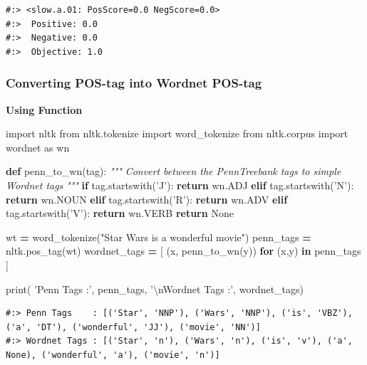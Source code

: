 \documentclass[
]{book}
\newenvironment{Shaded}{\begin{snugshade}}{\end{snugshade}}
\newcommand{\BuiltInTok}[1]{#1}
\newcommand{\CharTok}[1]{\textcolor[rgb]{0.5,0.5,0.5}{#1}}
\newcommand{\CommentTok}[1]{\textcolor[rgb]{0.37,0.37,0.37}{\textit{#1}}}
\newcommand{\ControlFlowTok}[1]{\textcolor[rgb]{0.27,0.27,0.27}{\textbf{#1}}}
\newcommand{\ImportTok}[1]{#1}
\newcommand{\KeywordTok}[1]{\textcolor[rgb]{0.27,0.27,0.27}{\textbf{#1}}}
\newcommand{\NormalTok}[1]{#1}
\newcommand{\OperatorTok}[1]{\textcolor[rgb]{0.43,0.43,0.43}{\textbf{#1}}}
\newcommand{\StringTok}[1]{\textcolor[rgb]{0.5,0.5,0.5}{#1}}
\newcommand{\VariableTok}[1]{\textcolor[rgb]{0,0,0}{#1}}
\begin{document}
\begin{verbatim}
#:> <slow.a.01: PosScore=0.0 NegScore=0.0> 
#:>  Positive: 0.0 
#:>  Negative: 0.0 
#:>  Objective: 1.0
\end{verbatim}

\hypertarget{converting-pos-tag-into-wordnet-pos-tag}{%
\subsubsection{Converting POS-tag into Wordnet POS-tag}\label{converting-pos-tag-into-wordnet-pos-tag}}

\textbf{Using Function}

\begin{Shaded}
\begin{Highlighting}[]
\ImportTok{import}\NormalTok{ nltk}
\ImportTok{from}\NormalTok{ nltk.tokenize }\ImportTok{import}\NormalTok{ word_tokenize}
\ImportTok{from}\NormalTok{ nltk.corpus }\ImportTok{import}\NormalTok{ wordnet }\ImportTok{as}\NormalTok{ wn}

\KeywordTok{def}\NormalTok{ penn_to_wn(tag):}
    \CommentTok{"""}
\CommentTok{    Convert between the PennTreebank tags to simple Wordnet tags}
\CommentTok{    """}
    \ControlFlowTok{if}\NormalTok{ tag.startswith(}\StringTok{'J'}\NormalTok{):}
        \ControlFlowTok{return}\NormalTok{ wn.ADJ}
    \ControlFlowTok{elif}\NormalTok{ tag.startswith(}\StringTok{'N'}\NormalTok{):}
        \ControlFlowTok{return}\NormalTok{ wn.NOUN}
    \ControlFlowTok{elif}\NormalTok{ tag.startswith(}\StringTok{'R'}\NormalTok{):}
        \ControlFlowTok{return}\NormalTok{ wn.ADV}
    \ControlFlowTok{elif}\NormalTok{ tag.startswith(}\StringTok{'V'}\NormalTok{):}
        \ControlFlowTok{return}\NormalTok{ wn.VERB}
    \ControlFlowTok{return} \VariableTok{None}

\NormalTok{wt }\OperatorTok{=}\NormalTok{ word_tokenize(}\StringTok{"Star Wars is a wonderful movie"}\NormalTok{)}
\NormalTok{penn_tags }\OperatorTok{=}\NormalTok{ nltk.pos_tag(wt)}
\NormalTok{wordnet_tags }\OperatorTok{=}\NormalTok{ [ (x, penn_to_wn(y)) }\ControlFlowTok{for}\NormalTok{ (x,y) }\KeywordTok{in}\NormalTok{ penn_tags ]}

\BuiltInTok{print}\NormalTok{(}
\StringTok{'Penn Tags    :'}\NormalTok{, penn_tags, }
\StringTok{'}\CharTok{\textbackslash{}n}\StringTok{Wordnet Tags :'}\NormalTok{, wordnet_tags)}
\end{Highlighting}
\end{Shaded}

\begin{verbatim}
#:> Penn Tags    : [('Star', 'NNP'), ('Wars', 'NNP'), ('is', 'VBZ'), ('a', 'DT'), ('wonderful', 'JJ'), ('movie', 'NN')] 
#:> Wordnet Tags : [('Star', 'n'), ('Wars', 'n'), ('is', 'v'), ('a', None), ('wonderful', 'a'), ('movie', 'n')]
\end{verbatim}
\end{document}
